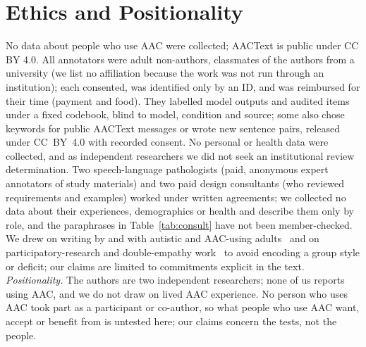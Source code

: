 \documentclass[conference,10pt]{IEEEtran}
\begin{document}
\section*{Ethics and Positionality}
No data about people who use AAC were collected; AACText is public under CC BY 4.0.
All annotators were adult non-authors, classmates of the authors from a university (we list no affiliation because the work was not run through an institution); each consented, was identified only by an ID, and was reimbursed for their time (payment and food).
They labelled model outputs and audited items under a fixed codebook, blind to model, condition and source; some also chose keywords for public AACText messages or wrote new sentence pairs, released under CC~BY~4.0 with recorded consent.
No personal or health data were collected, and as independent researchers we did not seek an institutional review determination.
Two speech-language pathologists (paid, anonymous expert annotators of study materials) and two paid design consultants (who reviewed requirements and examples) worked under written agreements; we collected no data about their experiences, demographics or health and describe them only by role, and the paraphrases in Table~\ref{tab:consult} have not been member-checked.
We drew on writing by and with autistic and AAC-using adults~\cite{zisk2019aac,donaldson2021everyone,frisch2026complicated} and on participatory-research and double-empathy work~\cite{nicolaidis2019aaspire,milton2012double} to avoid encoding a group style or deficit; our claims are limited to commitments explicit in the text.
\emph{Positionality.} The authors are two independent researchers; none of us reports using AAC, and we do not draw on lived AAC experience.
No person who uses AAC took part as a participant or co-author, so what people who use AAC want, accept or benefit from is untested here; our claims concern the tests, not the people.




\end{document}
